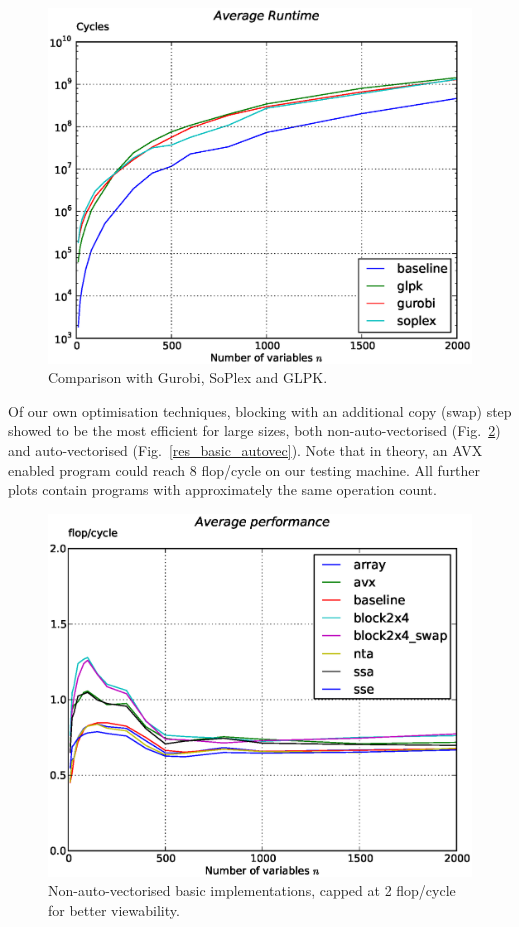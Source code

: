 \documentclass[letterpaper]{article}
\begin{document}
\begin{figure}\centering
  \includegraphics[scale=0.4]{img/results_compare_external.eps}
  \caption{Comparison with Gurobi, SoPlex and GLPK.\label{res_external}}
\end{figure}


Of our own optimisation techniques, blocking with an additional copy (swap) step showed to be the most efficient for large sizes,
both non-auto-vectorised (Fig.~\ref{res_basic_novec}) and auto-vectorised (Fig.~\ref{res_basic_autovec}).
Note that in theory, an AVX enabled program could reach 8 flop/cycle on our testing machine.
All further plots contain programs with approximately the same operation count.

\begin{figure}\centering
  \includegraphics[scale=0.4]{img/results_basic_novec.eps}
  \caption{Non-auto-vectorised basic implementations, capped at 2 flop/cycle for better viewability.\label{res_basic_novec}}
\end{figure}
\end{document}
